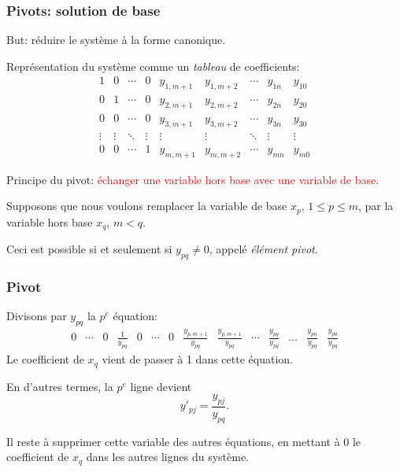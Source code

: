 \documentclass[t,usepdftitle=false]{beamer}
\begin{document}
\begin{frame}
\frametitle{Pivots: solution de base}

{\color{blue}But}: réduire le système à la forme canonique.

\mbox{}

Représentation du système comme un \textit{tableau} de coefficients:
\[
\begin{matrix}
1 & 0 & \cdots & 0 & y_{1,m+1} & y_{1,m+2} & \cdots & y_{1n} & y_{10} \\
0 & 1 & \cdots & 0 & y_{2,m+1} & y_{2,m+2} & \cdots & y_{2n} & y_{20} \\
0 & 0 & \cdots & 0 & y_{3,m+1} & y_{3,m+2} & \cdots & y_{3n} & y_{30} \\
\vdots & \vdots & \ddots & \vdots & \vdots & \vdots & \ddots & \vdots & \vdots \\
0 & 0 & \cdots & 1 & y_{m,m+1} & y_{m,m+2} & \cdots & y_{mn} & y_{m0}
\end{matrix}
\]

\mbox{}

Principe du pivot: \textcolor{red}{échanger une variable hors base avec une variable de base}.

\mbox{}

Supposons que nous voulons remplacer la variable de base $x_p$, $1 \leq p \leq m$, par la variable hors base $x_q$, $m < q$.

\mbox

Ceci est possible si et seulement si $y_{pq} \ne 0$, appelé {\sl élément pivot}.

\end{frame}

\begin{frame}
\frametitle{Pivot}

Divisons par $y_{pq}$ la $p^e$ équation:
\setcounter{MaxMatrixCols}{20}
$$
\begin{matrix}
0 & \cdots & 0 & \frac{1}{y_{pq}} & 0 & \cdots & 0 & \frac{y_{p,m+1}}{y_{pq}} & \frac{y_{p,m+1}}{y_{pq}} & %
\cdots & \frac{y_{pq}}{y_{pq}} & \ldots & \frac{y_{pn}}{y_{pq}} & \frac{y_{p0}}{y_{pq}}
\end{matrix}
$$
Le coefficient de $x_q$ vient de passer à 1 dans cette équation.

\mbox{}

En d'autres termes, la $p^e$ ligne devient
$$
 y'_{pj} = \frac{y_{pj}}{y_{pq}}.
$$

\mbox{}

Il reste à supprimer cette variable des autres équations, en mettant à 0 le coefficient de $x_q$ dans les autres lignes du système.

\end{frame}
\end{document}
